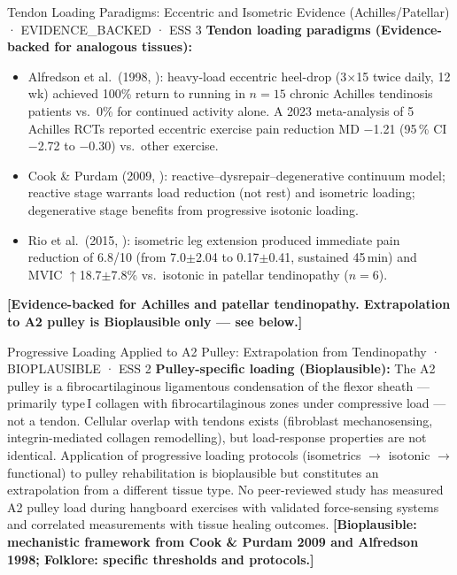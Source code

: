 \begin{evidencebox}{Tendon Loading Paradigms: Eccentric and Isometric Evidence (Achilles/Patellar) · EVIDENCE\_BACKED · ESS 3}
\textbf{Tendon loading paradigms (Evidence-backed for analogous tissues):}
\begin{itemize}[leftmargin=1.5em]
  \item Alfredson et al.\ (1998, \cite{APJL98}): heavy-load eccentric heel-drop (3$\times$15 twice daily, 12\,wk) achieved 100\% return to running in $n=15$ chronic Achilles tendinosis patients vs.\ 0\% for continued activity alone. A 2023 meta-analysis of 5 Achilles RCTs reported eccentric exercise pain reduction MD $-$1.21 (95\,\% CI $-$2.72 to $-$0.30) vs.\ other exercise.
  \item Cook \& Purdam (2009, \cite{CP08}): reactive--dysrepair--degenerative continuum model; reactive stage warrants load reduction (not rest) and isometric loading; degenerative stage benefits from progressive isotonic loading.
  \item Rio et al.\ (2015, \cite{RKPE15}): isometric leg extension produced immediate pain reduction of 6.8/10 (from 7.0$\pm$2.04 to 0.17$\pm$0.41, sustained 45\,min) and MVIC $\uparrow$18.7$\pm$7.8\% vs.\ isotonic in patellar tendinopathy ($n=6$).
\end{itemize}
\textbf{[Evidence-backed for Achilles and patellar tendinopathy. Extrapolation to A2 pulley is Bioplausible only --- see below.]}
\end{evidencebox}

\begin{bioplausbox}{Progressive Loading Applied to A2 Pulley: Extrapolation from Tendinopathy · BIOPLAUSIBLE · ESS 2}
\textbf{Pulley-specific loading (Bioplausible):} The A2 pulley is a fibrocartilaginous ligamentous condensation of the flexor sheath --- primarily type\,I collagen with fibrocartilaginous zones under compressive load --- not a tendon. Cellular overlap with tendons exists (fibroblast mechanosensing, integrin-mediated collagen remodelling), but load-response properties are not identical. Application of progressive loading protocols (isometrics $\to$ isotonic $\to$ functional) to pulley rehabilitation is bioplausible but constitutes an extrapolation from a different tissue type. No peer-reviewed study has measured A2 pulley load during hangboard exercises with validated force-sensing systems and correlated measurements with tissue healing outcomes. \textbf{[Bioplausible: mechanistic framework from Cook \& Purdam 2009 and Alfredson 1998; Folklore: specific thresholds and protocols.]}
\end{bioplausbox}

